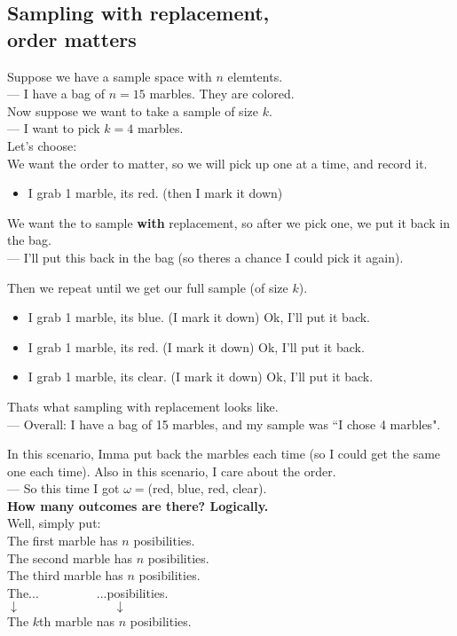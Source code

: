 \documentclass[12pt]{book}
\begin{document}
\subsection{Sampling with replacement, \\order matters}
Suppose we have a sample space with $n$ elemtents. \\
--- I have a bag of $n=15$ marbles. They are colored.\\
Now suppose we want to take a sample of size $k$. \\
--- I want to pick $k=4$ marbles.\\

\noindent Let's choose: \\
We want the order to matter, so we will pick up one at a time, and record it.
\begin{itemize}
\item I grab 1 marble, its red. (then I mark it down)
\end{itemize}
We want the to sample \textbf{with} replacement, so after we pick one, we put it back in the bag.\\
--- I'll put this back in the bag (so theres a chance I could pick it again).

\noindent Then we repeat until we get our full sample (of size $k$).
\begin{itemize}
\item I grab 1 marble, its blue. (I mark it down) Ok, I'll put it back.
\item I grab 1 marble, its red. (I mark it down) Ok, I'll put it back. 
\item I grab 1 marble, its clear. (I mark it down) Ok, I'll put it back.
\end{itemize}
Thats what sampling with replacement looks like. \\
--- Overall: I have a bag of 15 marbles, and my sample was ``I chose 4 marbles". 

In this scenario, Imma put back the marbles each time (so I could get the same one each time). Also in this scenario, I care about the order. \\
--- So this time I got $\omega =$(red, blue, red, clear).\\

\noindent \textbf{How many outcomes are there? Logically.}\\
Well, simply put:\\
The first marble has $n$ posibilities. \\
The second marble has $n$ posibilities.\\
The third marble has $n$ posibilities.\\
The...$~~~~~~~~~~~~~~~~~~~~~$...posibilities.\\
$\downarrow ~~~~~~~~~~~~~~~~~~~~~~~~~~~~~~~~~~\downarrow$\\
The $k$th marble nas $n$ posibilities.
\end{document}
